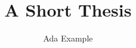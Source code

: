 \documentclass{report}
\begin{document}
\title{A Short Thesis}
\author{Ada Example}
\maketitle


\end{document}

